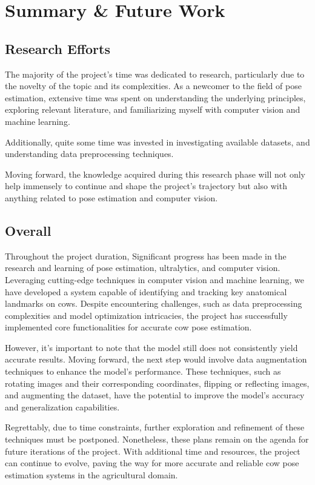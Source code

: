 \chapter{Summary \& Future Work}
\section{Research Efforts}
The majority of the project's time was dedicated to research, particularly due to the novelty of the topic and its complexities. As a newcomer to the field of pose estimation, extensive time was spent on understanding the underlying principles, exploring relevant literature, and familiarizing myself with computer vision and machine learning. 

Additionally, quite some time was invested in investigating available datasets, and understanding data preprocessing techniques.

Moving forward, the knowledge acquired during this research phase will not only help immensely to continue and shape the project's trajectory but also with anything related to pose estimation and computer vision.
\section{Overall}
Throughout the project duration,  Significant progress has been made in the research and learning of pose estimation, ultralytics, and computer vision. Leveraging cutting-edge techniques in computer vision and machine learning, we have developed a system capable of identifying and tracking key anatomical landmarks on cows. Despite encountering challenges, such as data preprocessing complexities and model optimization intricacies, the project has successfully implemented core functionalities for accurate cow pose estimation.

However, it's important to note that the model still does not consistently yield accurate results. Moving forward, the next step would involve data augmentation techniques to enhance the model's performance. These techniques, such as rotating images and their corresponding coordinates, flipping or reflecting images, and augmenting the dataset, have the potential to improve the model's accuracy and generalization capabilities.

Regrettably, due to time constraints, further exploration and refinement of these techniques must be postponed. Nonetheless, these plans remain on the agenda for future iterations of the project. With additional time and resources, the project can continue to evolve, paving the way for more accurate and reliable cow pose estimation systems in the agricultural domain.

